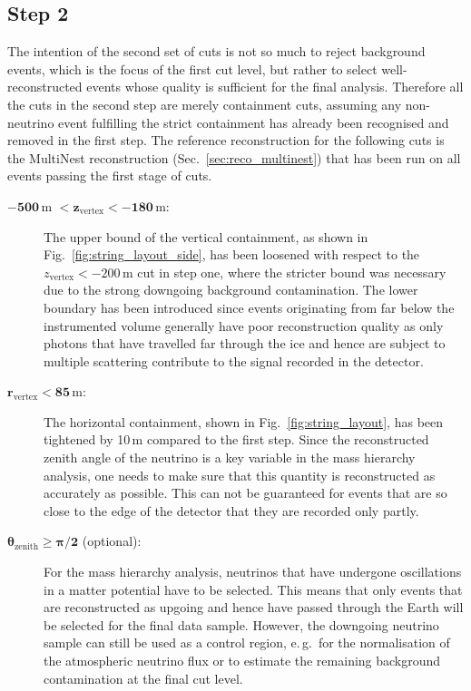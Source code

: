 \subsection{Step 2}
\label{sec:cuts_step2}

The intention of the second set of cuts is not so much to reject background
events, which is the focus of the first cut level, but rather to select
well-reconstructed events whose quality is sufficient for the final analysis.
Therefore all the cuts in the second step are merely containment cuts, assuming
any non-neutrino event fulfilling the strict containment has already been
recognised and removed in the first step. The reference reconstruction for the
following cuts is the MultiNest reconstruction (Sec.~\ref{sec:reco_multinest})
that has been run on all events passing the first stage of cuts.

\begin{description}
 \item[$\mathbf{-500}$\,m $\mathbf{< z_\mathrm{vertex} < -180}$\,m:] The upper
  bound of the vertical containment, as shown in
  Fig.~\ref{fig:string_layout_side}, has been loosened with respect to the
  $z_\mathrm{vertex} < -200$\,m cut in step one, where the stricter bound was
  necessary due to the strong downgoing background contamination. The lower
  boundary has been introduced since events originating from far below the
  instrumented volume generally have poor reconstruction quality as only
  photons that have travelled far through the ice and hence are subject to
  multiple scattering contribute to the signal recorded in the detector.

 \item[$\mathbf{r_\mathrm{vertex} < 85}$\,m:] The horizontal containment, shown
  in Fig.~\ref{fig:string_layout}, has  been tightened by 10\,m compared to the
  first step. Since the reconstructed  zenith angle of the neutrino is a key
  variable in the mass hierarchy  analysis, one needs to make sure that this
  quantity is reconstructed as accurately as possible. This can not be
  guaranteed for events that are so  close to the edge of the detector that they
  are recorded only partly.

 \item[$\mathbf{\theta_\mathrm{zenith} \geq \pi/2}$ (optional):] For the mass
  hierarchy analysis, neutrinos that have undergone oscillations in a matter
  potential have to be selected. This means that only events that are
  reconstructed as upgoing and hence have passed through the Earth will be
  selected for the final data sample. However, the downgoing neutrino sample
  can still be used as a control region, e.\,g.\ for the normalisation of the
  atmospheric neutrino flux or to estimate the remaining background
  contamination at the final cut level.
\end{description}


